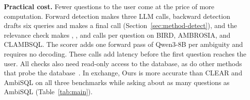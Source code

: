\textbf{Practical cost.} Fewer questions to the user come at the price
of more computation. Forward detection makes three LLM calls, backward
detection drafts six queries and makes a final call
(Section~\ref{sec:method-detect}), and the relevance check makes
\probeCallsBird, \probeCallsAmbrosia, and \probeCallsClamb{} \coder{}
calls per question on BIRD, AMBROSIA, and CLAMBSQL. The scorer adds
one forward pass of Qwen3-8B per ambiguity and requires no decoding.
These calls add latency before the first question reaches the user.
All checks also need read-only access to the database, as do other
methods that probe the database~\cite{tian2026pv,xiong2025multi}.
In exchange, Ours is more accurate than CLEAR and AmbiSQL on all
three benchmarks while asking about as many questions as AmbiSQL
(Table~\ref{tab:main}).
